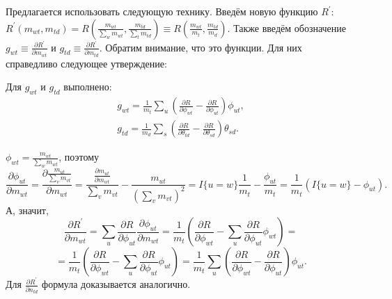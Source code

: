 \documentclass[12pt, twoside]{article}
\begin{document}
Предлагается использовать следующую технику. Введём новую функцию $R^{\prime}$: $R^{\prime}(m_{wt}, m_{td}) = R\left( \frac{m_{wt}}{\sum\limits_w m_{wt}},  \frac{m_{td}}{\sum\limits_t m_{td}}\right) \equiv R\left( \frac{m_{wt}}{m_t},  \frac{m_{td}}{m_d}\right)$. Также введём обозначение $g_{wt} \equiv \frac{\partial{R^{\prime}}}{\partial{m_{wt}}}$ и $g_{td} \equiv \frac{\partial{R^{\prime}}}{\partial{m_{td}}}$. Обратим внимание, что это функции. Для них справедливо следующее утверждение:
\begin{State}
\label{Stategradientvalue}           
Для $g_{wt}$ и $g_{td}$ выполнено:
\begin{equation}
\label{rgradient}
\begin{aligned}
g_{wt} = \frac{1}{m_t} \sum_{u} \left(\frac{\partial{R}}{\partial{\phi_{wt}}}  -  \frac{\partial{R}}{\partial{\phi_{ut}}} \right)  \phi_{ut},\\
g_{td} = \frac{1}{m_d} \sum_{s} \left(\frac{\partial{R}}{\partial{\theta_{td}}}  -  \frac{\partial{R}}{\partial{\theta_{sd}}} \right)  \theta_{sd} .
\end{aligned}
\end{equation}
\end{State}
\begin{Proof}
$\phi_{wt} = \frac{m_{wt}}{\sum_w m_{wt}}$, поэтому
\[
\frac{\partial{\phi_{ut}}}{\partial{m_{wt}}} = \frac{\partial{ \frac{m_{ut}}{\sum\limits_v m_{vt}}}}{\partial{m_{wt}}} = \frac{ \frac{\partial{m_{ut}}}{\partial{m_{wt}}}}{\sum\limits_v m_{vt}} - \frac{m_{ut}}{(\sum\limits_v m_{vt})^2} = I\{u = w\} \frac{1}{m_t} - \frac{\phi_{ut}}{m_t} = \frac{1}{m_t}\left( 
 I\{u = w\} - \phi_{ut} \right).
\]
А, значит,
\[
\frac{\partial{R^{\prime}}}{\partial{m_{wt}}} = \sum_{u} \frac{\partial{R}}{\partial{\phi_{ut}}} \frac{\partial{\phi_{ut}}}{\partial{m_{wt}}} = \frac{1}{m_t} \left( \frac{\partial{R}}{\partial{\phi_{wt}}} - \sum_{u}  \frac{\partial{R}}{\partial{\phi_{ut}}} \phi_{wt} \right) = 
\]
\[
=\frac{1}{m_t} \left( \frac{\partial{R}}{\partial{\phi_{wt}}} - \sum_{u}  \frac{\partial{R}}{\partial{\phi_{ut}}} \phi_{ut} \right) = \frac{1}{m_t} \sum_{u} \left(\frac{\partial{R}}{\partial{\phi_{wt}}}  -  \frac{\partial{R}}{\partial{\phi_{ut}}} \right)  \phi_{ut}.
\]
Для $\frac{\partial{R^{\prime}}}{\partial{n_{td}}}$ формула доказывается аналогично.
\end{Proof}
\medskip
\end{document}
